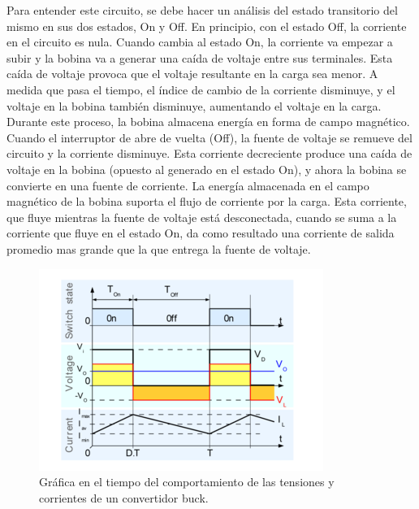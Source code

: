 Para entender este circuito, se debe hacer un análisis del estado transitorio del mismo en sus dos estados, On y Off. En principio, con el estado Off, la corriente en el circuito es nula. Cuando cambia al estado On, la corriente va empezar a subir y la bobina va a generar una caída de voltaje entre sus terminales. Esta caída de voltaje provoca que el voltaje resultante en la carga sea menor. A medida que pasa el tiempo, el índice de cambio de la corriente disminuye, y el voltaje en la bobina también disminuye, aumentando el voltaje en la carga. Durante este proceso, la bobina almacena energía en forma de campo magnético. \\

Cuando el interruptor de abre de vuelta (Off), la fuente de voltaje se remueve del circuito y la corriente disminuye. Esta corriente decreciente produce una caída de voltaje en la bobina (opuesto al generado en el estado On), y ahora la bobina se convierte en una fuente de corriente. La energía almacenada en el campo magnético de la bobina suporta el flujo de corriente por la carga. Esta corriente, que fluye mientras la fuente de voltaje está desconectada, cuando se suma a la corriente que fluye en el estado On, da como resultado una corriente de salida promedio mas grande que la que entrega la fuente de voltaje.\\

\begin{figure}[H]
    \centering
    \includegraphics[width=1\linewidth]{MPPT/350px-Buck_chronogram.png}
    \caption{Gráfica en el tiempo del comportamiento de las tensiones y corrientes de un convertidor buck.}
    \label{fig:grafica-mppt}
\end{figure}

